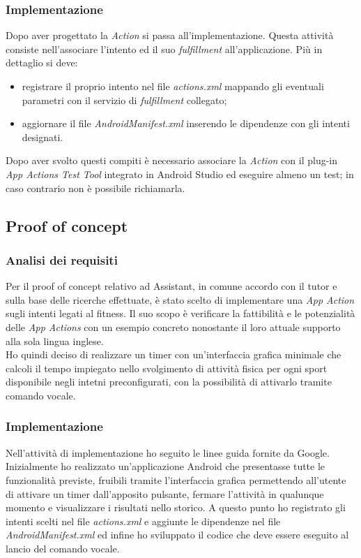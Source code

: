 		\subsubsection{Implementazione}
		Dopo aver progettato la \emph{Action} si passa all'implementazione. Questa attività consiste nell'associare l'intento ed il suo \emph{fulfillment} all'applicazione. Più in dettaglio si deve:
		\begin{itemize}
			\item registrare il proprio intento nel file \emph{actions.xml} mappando gli eventuali parametri con il servizio di \emph{fulfillment} collegato;
			\item aggiornare il file \emph{AndroidManifest.xml} inserendo le dipendenze con gli intenti designati.
		\end{itemize}
		Dopo aver svolto questi compiti è necessario associare la \emph{Action} con il plug-in \emph{App Actions Test Tool} integrato in Android Studio ed eseguire almeno un test; in caso contrario non è possibile richiamarla.
	\subsection{Proof of concept}
		\subsubsection{Analisi dei requisiti}
		Per il proof of concept relativo ad Assistant, in comune accordo con il tutor e sulla base delle ricerche effettuate, è stato scelto di implementare una \emph{App Action} sugli intenti legati al fitness. Il suo scopo è verificare la fattibilità e le potenzialità delle \emph{App Actions} con un esempio concreto nonostante il loro attuale supporto alla sola lingua inglese. \\
		Ho quindi deciso di realizzare un timer con un'interfaccia grafica minimale che calcoli il tempo impiegato nello svolgimento di attività fisica per ogni sport disponibile negli intetni preconfigurati, con la possibilità di attivarlo tramite comando vocale.
		\subsubsection{Implementazione}	\mbox{}
		Nell'attività di implementazione ho seguito le linee guida fornite da Google. Inizialmente ho realizzato un'applicazione Android che presentasse tutte le funzionalità previste, fruibili tramite l'interfaccia grafica permettendo all'utente di attivare un timer dall'apposito pulsante, fermare l'attività in qualunque momento e visualizzare i risultati nello storico. A questo punto ho registrato gli intenti scelti nel file \emph{actions.xml} e aggiunte le dipendenze nel file \emph{AndroidManifest.xml} ed infine ho sviluppato il codice che deve essere eseguito al lancio del comando vocale.
		
